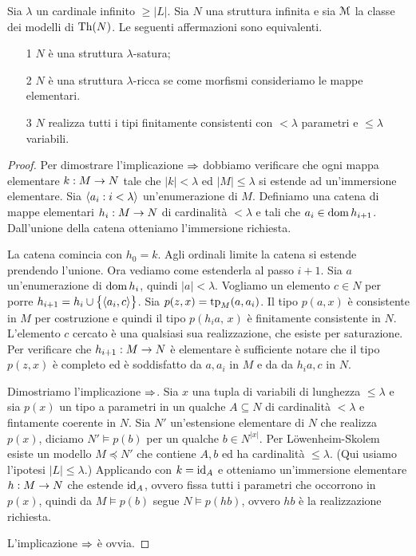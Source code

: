 \begin{lemma}\label{saturo->ricco}
Sia $\lambda$ un cardinale infinito $\ge|L|$. Sia $N$ una struttura infinita e sia $\EuScript M$ la classe dei modelli di $\textrm{Th}(N)$. Le seguenti affermazioni sono equivalenti. 
\begin{itemize}
\item[1] $N$ \`e una struttura $\lambda$-satura;
\item[2] $N$ \`e una struttura $\lambda$-ricca se come morfismi consideriamo le mappe elementari.
\item[3] $N$ realizza tutti i tipi finitamente consistenti con $<\lambda$ parametri e $\le\lambda$ variabili.
\end{itemize}
\end{lemma}
\begin{proof}
Per dimostrare l'implicazione $\Rightarrow$ dobbiamo verificare che ogni mappa elementare $k:M\rightarrow N$ tale che $|k|<\lambda$ ed $|M|\le\lambda$ si estende ad un'immersione elementare. Sia $\langle a_i:i<\lambda\rangle$ un'enumerazione di $M$. Definiamo una catena di mappe elementari $h_i:M\rightarrow N$ di cardinalit\`a $<\lambda$ e tali che $a_i\in\mathop{\rm dom} h_{i+1}$. Dall'unione della catena otteniamo l'immersione richiesta.

La catena comincia con $h_0=k$. Agli ordinali limite la catena si estende prendendo l'unione. Ora vediamo come estenderla al passo $i+1$. Sia $a$ un'enumerazione di $\mathop{\rm dom} h_i$, quindi $|a|<\lambda$.  Vogliamo un elemento $c\in N$ per porre $h_{i+1}=h_i\cup\big\{\langle a_i,c\rangle\big\}$. Sia $p(z,x)=\textrm{tp}_M(a,a_i)$. Il tipo $p(a,x)$ \`e consistente in $M$ per costruzione e quindi il tipo $p(h_ia,\,x)$  \`e finitamente consistente in $N$. L'elemento $c$ cercato \`e una qualsiasi sua realizzazione, che esiste per saturazione. Per verificare che $h_{i+1}:M\rightarrow N$ \`e elementare \`e sufficiente notare che il tipo $p(z,x)$ \`e completo ed \`e soddisfatto da $a,a_i$ in $M$ e da da $h_ia,c$ in $N$.

Dimostriamo l'implicazione $\Rightarrow$. Sia $x$ una tupla di variabili di lunghezza $\le\lambda$ e sia $p(x)$ un tipo a parametri in un qualche $A\subseteq N$ di cardinalit\`a $<\lambda$ e fintamente coerente in $N$. Sia $N'$ un'estensione elementare di $N$ che realizza $p(x)$, diciamo $N'\models p(b)$ per un qualche $b\in N^{|x|}$. Per L\"owenheim-Skolem esiste un modello $M\preceq N'$ che contiene $A,b$ ed ha cardinalit\`a $\le\lambda$. (Qui usiamo l'ipotesi $|L|\le\lambda$.) Applicando  con $k=\textrm{id}_A$ e otteniamo un'immersione elementare $h:M\rightarrow N$ che estende $\textrm{id}_A$, ovvero fissa tutti i parametri che occorrono in $p(x)$, quindi da $M\models p(b)$ segue $N\models p(hb)$, ovvero $hb$ \`e la realizzazione richiesta.

L'implicazione $\Rightarrow$ \`e ovvia. 
\end{proof}

